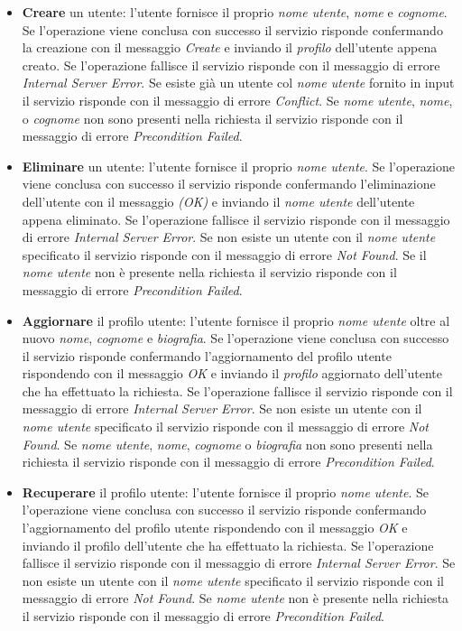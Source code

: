 \begin{itemize}
%
    \item \textbf{Creare} un utente: l'utente fornisce il proprio \textit{nome utente}, \textit{nome} e \textit{cognome}. Se l'operazione viene conclusa con successo il servizio risponde confermando la creazione con il messaggio \textit{Create} e inviando il \textit{profilo} dell'utente appena creato. Se l'operazione fallisce il servizio risponde con il messaggio di errore \textit{Internal Server Error}. Se esiste già un utente col \textit{nome utente} fornito in input il servizio risponde con il messaggio di errore \textit{Conflict}.  Se \textit{nome utente}, \textit{nome}, o \textit{cognome} non sono presenti nella richiesta il servizio risponde con il messaggio di errore \textit{Precondition Failed}.
%
    \item \textbf{Eliminare} un utente: l'utente fornisce il proprio \textit{nome utente}. Se l'operazione viene conclusa con successo il servizio risponde confermando l'eliminazione dell'utente con il messaggio \textit{(OK)} e inviando il \textit{nome utente} dell'utente appena eliminato. Se l'operazione fallisce il servizio risponde con il messaggio di errore \textit{Internal Server Error}. Se non esiste un utente con il \textit{nome utente} specificato il servizio risponde con il messaggio di errore \textit{Not Found}. Se il \textit{nome utente} non è presente nella richiesta il servizio risponde con il messaggio di errore \textit{Precondition Failed}.
%
    \item \textbf{Aggiornare} il profilo utente: l'utente fornisce il proprio \textit{nome utente} oltre al nuovo \textit{nome}, \textit{cognome} e \textit{biografia}. Se l'operazione viene conclusa con successo il servizio risponde confermando l'aggiornamento del profilo utente rispondendo con il messaggio \textit{OK} e inviando il \textit{profilo} aggiornato dell'utente che ha effettuato la richiesta. Se l'operazione fallisce il servizio risponde con il messaggio di errore \textit{Internal Server Error}. Se non esiste un utente con il \textit{nome utente} specificato il servizio risponde con il messaggio di errore \textit{Not Found}. Se \textit{nome utente}, \textit{nome}, \textit{cognome} o \textit{biografia} non sono presenti nella richiesta il servizio risponde con il messaggio di errore \textit{Precondition Failed}.
%
    \item \textbf{Recuperare} il profilo utente: l'utente fornisce il proprio \textit{nome utente}. Se l'operazione viene conclusa con successo il servizio risponde confermando l'aggiornamento del profilo utente rispondendo con il messaggio \textit{OK} e inviando il profilo dell'utente che ha effettuato  la richiesta. Se l'operazione fallisce il servizio risponde con il messaggio di errore \textit{Internal Server Error}. Se non esiste un utente con il \textit{nome utente} specificato il servizio risponde con il messaggio di errore \textit{Not Found}. Se \textit{nome utente} non \`e presente nella richiesta il servizio risponde con il messaggio di errore \textit{Precondition Failed}.
%
\end{itemize}

